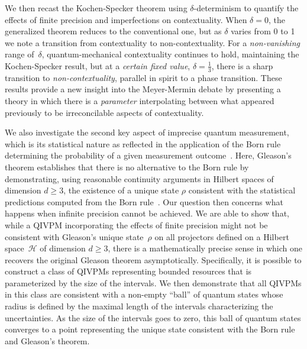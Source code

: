 \documentclass[english,reprint, aps, prl,superscriptaddress, showpacs,
showkeys, longbibliography, amsmath, amssymb, floatfix]{revtex4-1}
\theoremstyle{plain}
\theoremstyle{definition}
\newcommand{\Hilb}{\mathcal{H}}
\begin{document}

We then recast the Kochen-Specker theorem using
$\delta$-determinism to quantify the effects of finite precision and
imperfections on contextuality. When $\delta=0$, the generalized
theorem reduces to the conventional one, but as $\delta$ varies from 0
to 1 we note a transition from contextuality to non-contextuality. For
a \emph{non-vanishing} range of~$\delta$, quantum-mechanical
contextuality continues to hold, maintaining the Kochen-Specker
result, but at a \emph{certain fixed value}, $\delta = \frac{1}{3}$,
there is a sharp transition to \emph{non-contextuality}, parallel in
spirit to a phase transition.  These results provide a new insight
into the Meyer-Mermin debate by presenting a theory in which there is
a \emph{parameter} interpolating between what appeared previously to
be irreconcilable aspects of contextuality.

We also investigate the second key aspect of imprecise quantum
measurement, which is its statistical nature as reflected in the
application of the Born rule determining the probability of a given
measurement outcome~\cite{Born1983bibTeX,Mermin2007,Jaeger2007}.
Here, Gleason's theorem establishes that there is no alternative to
the Born rule by demonstrating, using reasonable continuity arguments
in Hilbert spaces of dimension $d\ge3$, the existence of a unique
state $\rho$ consistent with the statistical predictions computed from
the Born rule~\cite{gleason1957,Redhead1987-REDINA,peres1995quantum}.
Our question then concerns what happens when infinite precision cannot
be achieved.  We are able to show that, while a QIVPM incorporating
the effects of finite precision might not be consistent with Gleason's
unique state~$\rho$ on all projectors defined on a Hilbert
space~$\Hilb$ of dimension $d\ge3$, there is a mathematically precise
sense in which one recovers the original Gleason theorem
asymptotically.  Specifically, it is possible to construct a class of
QIVPMs representing bounded resources that is parameterized by the
size of the intervals. We then demonstrate that all QIVPMs in this
class are consistent with a non-empty ``ball'' of quantum states whose
radius is defined by the maximal length of the intervals
characterizing the uncertainties. As the size of the intervals goes to
zero, this ball of quantum states converges to a point representing
the unique state consistent with the Born rule and Gleason's theorem.
\end{document}
